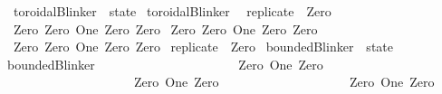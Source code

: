 \begin{isabellebody}
\ toroidalBlinker\ {\isacharcolon}{\isacharcolon}\ state\ \isanewline
{\isachardoublequoteopen}toroidalBlinker\ {\isasymequiv}\isanewline
\ {\isacharbrackleft}replicate\ {}\ Zero{\isacharcomma}\isanewline
\ {\isacharbrackleft}Zero\ {\isacharcomma}Zero{\isacharcomma}\ One{\isacharcomma}\ Zero{\isacharcomma}\ Zero{\isacharbrackright}{\isacharcomma}\isanewline
\ {\isacharbrackleft}Zero{\isacharcomma}\ Zero{\isacharcomma}\ One{\isacharcomma}\ Zero{\isacharcomma}\ Zero{\isacharbrackright}{\isacharcomma}\isanewline
\ {\isacharbrackleft}Zero{\isacharcomma}\ Zero{\isacharcomma}\ One{\isacharcomma}\ Zero{\isacharcomma}\ Zero{\isacharbrackright}{\isacharcomma}\isanewline
\ replicate\ {}\ Zero{\isacharbrackright}{\isachardoublequoteclose}\isanewline
\isanewline
{}\isamarkupfalse%
\ boundedBlinker\ {\isacharcolon}{\isacharcolon}\ state\ \isanewline
{\isachardoublequoteopen}boundedBlinker\ {\isasymequiv}\ {\isacharbrackleft}\isanewline
\ \ \ \ \ \ \ \ \ \ \ \ \ \ \ \ \ \ \ \ {\isacharbrackleft}Zero{\isacharcomma}\ One{\isacharcomma}\ Zero{\isacharbrackright}{\isacharcomma}\isanewline
\ \ \ \ \ \ \ \ \ \ \ \ \ \ \ \ \ \ \ \ {\isacharbrackleft}Zero{\isacharcomma}\ One{\isacharcomma}\ Zero{\isacharbrackright}{\isacharcomma}\isanewline
\ \ \ \ \ \ \ \ \ \ \ \ \ \ \ \ \ \ \ \ {\isacharbrackleft}Zero{\isacharcomma}\ One{\isacharcomma}\ Zero{\isacharbrackright}\isanewline
\ \ \ \ \ \ \ \ \ \ \ \ \ \ \ \ \ \ \ {\isacharbrackright}{\isachardoublequoteclose}\isanewline
%
\isadelimtheory
%
\endisadelimtheory
%
\isatagtheory
{}\isamarkupfalse%
%
\endisatagtheory
{\isafoldtheory}%
%
\isadelimtheory
%
\endisadelimtheory
%
\end{isabellebody}%
\endinput
